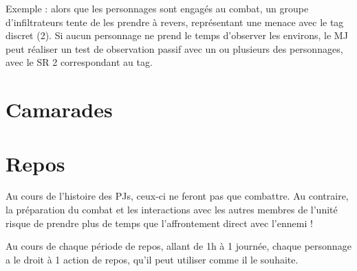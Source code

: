 \documentclass{report}
\begin{document}
\begin{multicols}{2}
Exemple : alors que les personnages sont engagés au combat, un groupe d'infiltrateurs tente de les prendre à revers, représentant une menace avec le tag discret (2). Si aucun personnage ne prend le temps d'observer les environs, le MJ peut réaliser un test de observation passif avec un ou plusieurs des personnages, avec le SR 2 correspondant au tag.
\section{Camarades}


\section{Repos}
Au cours de l'histoire des PJs, ceux-ci ne feront pas que combattre. Au contraire, la préparation du combat et les interactions avec les autres membres de l'unité risque de prendre plus de temps que l'affrontement direct avec l'ennemi !

Au cours de chaque période de repos, allant de 1h à 1 journée, chaque personnage a le droit à 1 action de repos, qu'il peut utiliser comme il le souhaite.


\end{multicols}
\end{document}
